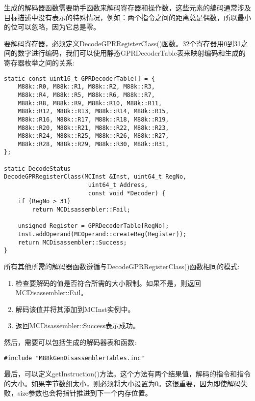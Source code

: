 生成的解码器函数需要助手函数来解码寄存器和操作数，这些元素的编码通常涉及目标描述中没有表示的特殊情况，例如：两个指令之间的距离总是偶数，所以最小的位可以忽略，因为它总是零。\par

要解码寄存器，必须定义DecodeGPRRegisterClass()函数。32个寄存器用0到31之间的数字进行编码，我们可以使用静态GPRDecoderTable表来映射编码和生成的寄存器枚举之间的关系:\par

\begin{lstlisting}[caption={}]
static const uint16_t GPRDecoderTable[] = {
	M88k::R0, M88k::R1, M88k::R2, M88k::R3,
	M88k::R4, M88k::R5, M88k::R6, M88k::R7,
	M88k::R8, M88k::R9, M88k::R10, M88k::R11,
	M88k::R12, M88k::R13, M88k::R14, M88k::R15,
	M88k::R16, M88k::R17, M88k::R18, M88k::R19,
	M88k::R20, M88k::R21, M88k::R22, M88k::R23,
	M88k::R24, M88k::R25, M88k::R26, M88k::R27,
	M88k::R28, M88k::R29, M88k::R30, M88k::R31,
};

static DecodeStatus
DecodeGPRRegisterClass(MCInst &Inst, uint64_t RegNo,
						uint64_t Address,
						const void *Decoder) {
	if (RegNo > 31)
		return MCDisassembler::Fail;
		
	unsigned Register = GPRDecoderTable[RegNo];
	Inst.addOperand(MCOperand::createReg(Register));
	return MCDisassembler::Success;
}
\end{lstlisting}

所有其他所需的解码器函数遵循与DecodeGPRRegisterClass()函数相同的模式:\par

\begin{enumerate}
\item 检查要解码的值是否符合所需的大小限制。如果不是，则返回MCDisassembler::Fail。

\item 解码该值并将其添加到MCInst实例中。

\item 返回MCDisassembler::Success表示成功。

\end{enumerate}

然后，需要可以包括生成的解码器表和函数:\par

\begin{lstlisting}[caption={}]
#include "M88kGenDisassemblerTables.inc"
\end{lstlisting}

最后，可以定义getInstruction()方法。这个方法有两个结果值，解码的指令和指令的大小。如果字节数组太小，则必须将大小设置为0。这很重要，因为即使解码失败，size参数也会将指针推进到下一个内存位置。\par

